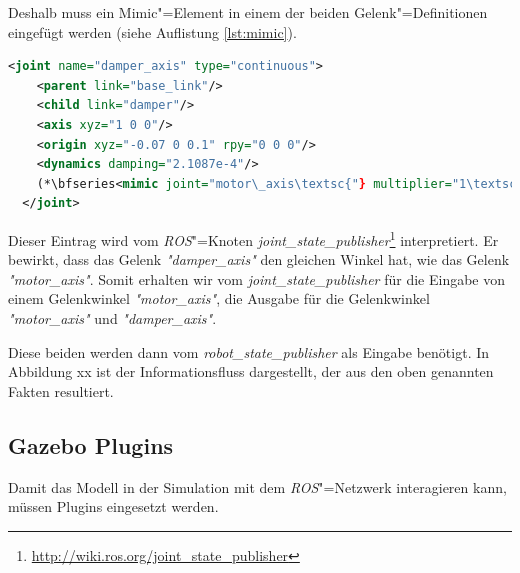 Deshalb muss ein Mimic"=Element in einem der beiden Gelenk"=Definitionen eingefügt werden (siehe Auflistung \ref{lst:mimic}). 
\begin{lstlisting}[language=xml, captionpos=b, caption=Mimic in URDF-Joint, label={lst:mimic}, gobble=2]
  <joint name="damper_axis" type="continuous">
    <parent link="base_link"/>
    <child link="damper"/>
    <axis xyz="1 0 0"/>
    <origin xyz="-0.07 0 0.1" rpy="0 0 0"/>
    <dynamics damping="2.1087e-4"/>
    (*\bfseries<mimic joint="motor\_axis\textsc{"} multiplier="1\textsc{"} offset="0"/>*)
  </joint>
\end{lstlisting}

Dieser Eintrag wird vom \textit{ROS}"=Knoten \textit{joint\_state\_publisher}\footnote{\url{http://wiki.ros.org/joint_state_publisher}} interpretiert.
Er bewirkt, dass das Gelenk \textit{\textit{"}damper\_axis\textit{"}} den gleichen Winkel hat, wie das Gelenk \textit{\textit{"}motor\_axis\textit{"}}.
Somit erhalten wir vom \textit{joint\_state\_publisher} für die Eingabe von einem Gelenkwinkel \textit{\textit{"}motor\_axis\textit{"}}, die Ausgabe für die Gelenkwinkel \textit{\textit{"}motor\_axis\textit{"}} und \textit{\textit{"}damper\_axis\textit{"}}.

Diese beiden werden dann vom \textit{robot\_state\_publisher} als Eingabe benötigt.
In Abbildung xx ist der Informationsfluss dargestellt, der aus den oben genannten Fakten resultiert. %

\subsection{Gazebo Plugins}
Damit das Modell in der Simulation mit dem \textit{ROS}"=Netzwerk interagieren kann, müssen Plugins eingesetzt werden.


